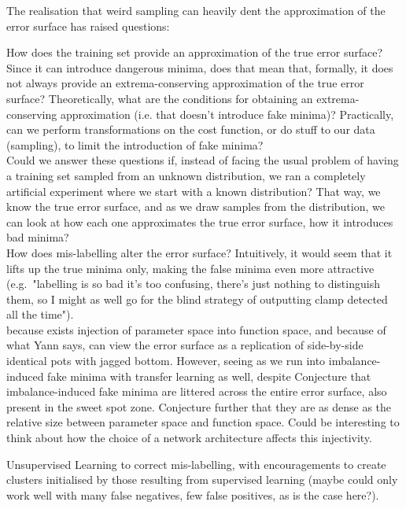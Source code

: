 \documentclass[a4paper,11pt]{article}
\begin{document}
The realisation that weird sampling can heavily dent the approximation of the error surface has raised questions:

How does the training set provide an approximation of the true error surface? Since it can introduce dangerous minima, does that mean that, formally, it does not always provide an extrema-conserving approximation of the true error surface? Theoretically, what are the conditions for obtaining an extrema-conserving approximation (i.e. that doesn't introduce fake minima)? Practically, can we perform transformations on the cost function, or do stuff to our data (sampling), to limit the introduction of fake minima?  \\

Could we answer these questions if, instead of facing the usual problem of having a training set sampled from an unknown distribution, we ran a completely artificial experiment where we start with a known distribution? That way, we know the true error surface, and as we draw samples from the distribution, we can look at how each one approximates the true error surface, how it introduces bad minima? \\

How does mis-labelling alter the error surface? Intuitively, it would seem that it lifts up the true minima only, making the false minima even more attractive (e.g.\ "labelling is so bad it's too confusing, there's just nothing to distinguish them, so I might as well go for the blind strategy of outputting clamp detected all the time"). \\

because exists injection of parameter space into function space, and because of what Yann says, can view the error surface as a replication of side-by-side identical pots with jagged bottom. However, seeing as we run into imbalance-induced fake minima with transfer learning as well, despite
Conjecture that imbalance-induced fake minima are littered across the entire error surface, also present in the sweet spot zone. Conjecture further that they are as dense as the relative size between parameter space and function space. Could be interesting to think about how the choice of a network architecture affects this injectivity.

Unsupervised Learning to correct mis-labelling, with encouragements to create clusters initialised by those resulting from supervised learning (maybe could only work well with many false negatives, few false positives, as is the case here?). \\ 
\end{document}
